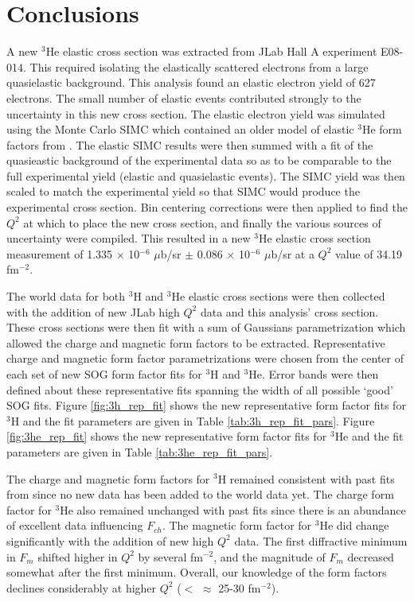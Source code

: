 \chapter{Conclusions} %
\label{ch:conclusions} %

A new $^3$He elastic cross section was extracted from JLab Hall A experiment E08-014. This required isolating the elastically scattered electrons from a large quasielastic background. This analysis found an elastic electron yield of 627 electrons. The small number of elastic events contributed strongly to the uncertainty in this new cross section. The elastic electron yield was simulated using the Monte Carlo SIMC which contained an older model of elastic $^3$He form factors from \cite{Article:Amroun}. The elastic SIMC results were then summed with a fit of the quasieastic background of the experimental data so as to be comparable to the full experimental yield (elastic and quasielastic events). The SIMC yield was then scaled to match the experimental yield so that SIMC would produce the experimental cross section. Bin centering corrections were then applied to find the $Q^2$ at which to place the new cross section, and finally the various sources of uncertainty were compiled. This resulted in a new $^3$He elastic cross section measurement of 1.335 $\times$ 10$^{-6}$ $\mu$b/sr $\pm$ 0.086 $\times$ 10$^{-6}$ $\mu$b/sr at a $Q^2$ value of 34.19 fm$^{-2}$. 

The world data for both $^3$H and $^3$He elastic cross sections were then collected with the addition of new JLab high $Q^2$ data and this analysis' cross section. These cross sections were then fit with a sum of Gaussians parametrization which allowed the charge and magnetic form factors to be extracted. Representative charge and magnetic form factor parametrizations were chosen from the center of each set of new SOG form factor fits for $^3$H and $^3$He. Error bands were then defined about these representative fits spanning the width of all possible `good' SOG fits. Figure \ref{fig:3h_rep_fit} shows the new representative form factor fits for $^3$H and the fit parameters are given in Table \ref{tab:3h_rep_fit_pars}. Figure \ref{fig:3he_rep_fit} shows the new representative form factor fits for $^3$He and the fit parameters are given in Table \ref{tab:3he_rep_fit_pars}.

The charge and magnetic form factors for $^3$H remained consistent with past fits from \cite{Article:Amroun} since no new data has been added to the world data yet. The charge form factor for $^3$He also remained unchanged with past fits since there is an abundance of excellent data influencing $F_{ch}$. The magnetic form factor for $^3$He did change significantly with the addition of new high $Q^2$ data. The first diffractive minimum in $F_m$ shifted higher in $Q^2$ by several fm$^{-2}$, and the magnitude of $F_m$ decreased somewhat after the first minimum. Overall, our knowledge of the form factors declines considerably at higher $Q^2$ ($<$ $\approx$ 25-30 fm$^{-2}$). 

